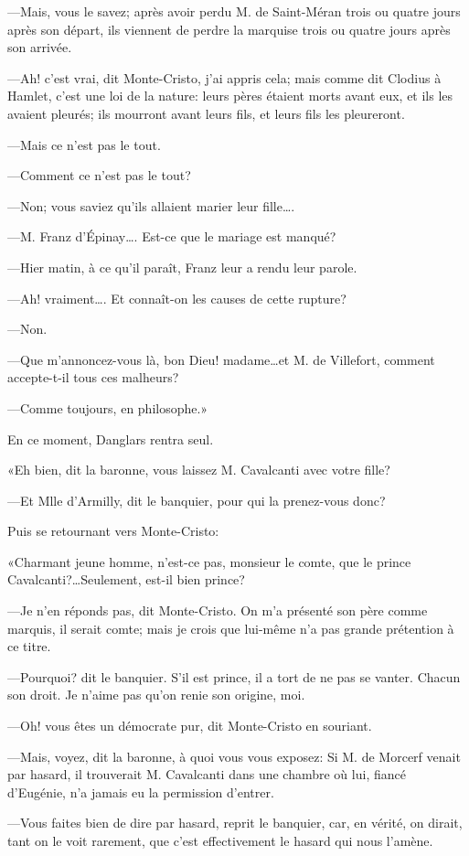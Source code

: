 —Mais, vous le savez; après avoir perdu M. de Saint-Méran trois ou quatre jours après son départ, ils viennent de perdre la marquise trois ou quatre jours après son arrivée. 

—Ah! c'est vrai, dit Monte-Cristo, j'ai appris cela; mais comme dit Clodius à Hamlet, c'est une loi de la nature: leurs pères étaient morts avant eux, et ils les avaient pleurés; ils mourront avant leurs fils, et leurs fils les pleureront. 

—Mais ce n'est pas le tout. 

—Comment ce n'est pas le tout? 

—Non; vous saviez qu'ils allaient marier leur fille\dots. 

—M. Franz d'Épinay\dots. Est-ce que le mariage est manqué? 

—Hier matin, à ce qu'il paraît, Franz leur a rendu leur parole. 

—Ah! vraiment\dots. Et connaît-on les causes de cette rupture? 

—Non. 

—Que m'annoncez-vous là, bon Dieu! madame\dots et M. de Villefort, comment accepte-t-il tous ces malheurs? 

—Comme toujours, en philosophe.» 

En ce moment, Danglars rentra seul. 

«Eh bien, dit la baronne, vous laissez M. Cavalcanti avec votre fille? 

—Et Mlle d'Armilly, dit le banquier, pour qui la prenez-vous donc? 

Puis se retournant vers Monte-Cristo: 

«Charmant jeune homme, n'est-ce pas, monsieur le comte, que le prince Cavalcanti?\dots Seulement, est-il bien prince?  

—Je n'en réponds pas, dit Monte-Cristo. On m'a présenté son père comme marquis, il serait comte; mais je crois que lui-même n'a pas grande prétention à ce titre. 

—Pourquoi? dit le banquier. S'il est prince, il a tort de ne pas se vanter. Chacun son droit. Je n'aime pas qu'on renie son origine, moi. 

—Oh! vous êtes un démocrate pur, dit Monte-Cristo en souriant. 

—Mais, voyez, dit la baronne, à quoi vous vous exposez: Si M. de Morcerf venait par hasard, il trouverait M. Cavalcanti dans une chambre où lui, fiancé d'Eugénie, n'a jamais eu la permission d'entrer. 

—Vous faites bien de dire par hasard, reprit le banquier, car, en vérité, on dirait, tant on le voit rarement, que c'est effectivement le hasard qui nous l'amène. 


